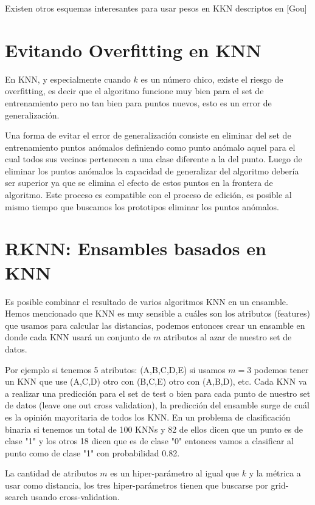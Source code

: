 Existen otros esquemas interesantes para usar pesos en KKN descriptos en [Gou]

\section{Evitando Overfitting en KNN}

En KNN, y especialmente cuando $k$ es un número chico, existe el riesgo de overfitting, es decir que el algoritmo funcione muy bien para el set de entrenamiento pero no tan bien para puntos nuevos, esto es un error de generalización.

Una forma de evitar el error de generalización consiste en eliminar del set de entrenamiento puntos anómalos definiendo como punto anómalo aquel para el cual todos sus vecinos pertenecen a una clase diferente a la del punto. Luego de eliminar los puntos anómalos la capacidad de generalizar del algoritmo debería ser superior ya que se elimina el efecto de estos puntos en la frontera de algoritmo. Este proceso es compatible con el proceso de edición, es posible al mismo tiempo que buscamos los prototipos eliminar los puntos anómalos.

\section{RKNN: Ensambles basados en KNN}

Es posible combinar el resultado de varios algoritmos KNN en un ensamble. Hemos mencionado que KNN es muy sensible a cuáles son los atributos (features) que usamos para calcular las distancias, podemos entonces crear un ensamble en donde cada KNN usará un conjunto de $m$ atributos al azar de nuestro set de datos.

Por ejemplo si tenemos 5 atributos: (A,B,C,D,E) si usamos $m=3$ podemos tener un KNN que use (A,C,D) otro con (B,C,E) otro con (A,B,D), etc. Cada KNN va a realizar una predicción para el set de test o bien para cada punto de nuestro set de datos (leave one out cross validation), la predicción del ensamble surge de cuál es la opinión mayoritaria de todos los KNN. En un problema de clasificación binaria si tenemos un total de 100 KNNs y 82 de ellos dicen que un punto es de clase "1" y los otros 18 dicen que es de clase "0" entonces vamos a clasificar al punto como de clase "1" con probabilidad 0.82. 

La cantidad de atributos $m$ es un hiper-parámetro al igual que $k$ y la métrica a usar como distancia, los tres hiper-parámetros tienen que buscarse por grid-search usando cross-validation. 

